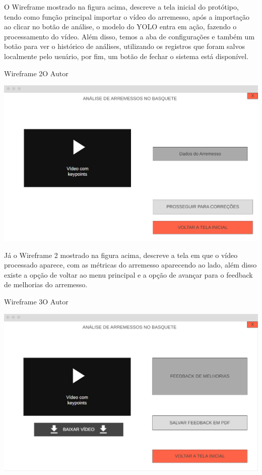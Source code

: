 O Wireframe mostrado na figura acima, descreve a tela inicial do protótipo, tendo como função principal importar o vídeo do arremesso, após a importação ao clicar no botão de análise, o modelo do YOLO entra em ação, fazendo o processamento do vídeo.
Além disso, temos a aba de configurações e também um botão para ver o histórico de análises, utilizando os registros que foram salvos localmente pelo usuário, por fim, um botão de fechar o sistema está disponível.


\begin{figura}{Wireframe 2}{O Autor}
    \begin{flushleft}
        \label{fig:wireframe2}
        \includegraphics[width=0.69\linewidth]{resources/floats/ilustracoes/WIREFRAME2.png}
    \end{flushleft}
\end{figura}
\FloatBarrier

Já o Wireframe 2 mostrado na figura acima, descreve a tela em que o vídeo processado aparece, com as métricas do arremesso aparecendo ao lado, além disso existe a opção de voltar ao menu principal e a opção de avançar para o feedback de melhorias do arremesso.


\begin{figura}{Wireframe 3}{O Autor}
    \begin{flushleft}
        \label{fig:wireframe3}
        \includegraphics[width=0.69\linewidth]{resources/floats/ilustracoes/WIREFRAME3.png}
    \end{flushleft}
\end{figura}
\FloatBarrier

